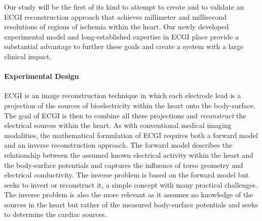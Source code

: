 Our study will be the first of its kind to attempt to create and to
validate an ECGI reconstruction approach that achieves millimeter and
millisecond resolutions of regions of ischemia within the heart. Our newly
developed experimental model and long-established expertise in ECGI place
provide a substantial advantage to further these goals and create a system
with a large clinical impact.


\paragraph{Experimental Design} ECGI is an image reconstruction technique in
which each electrode lead is a projection of the sources of bioelectricity
within the heart onto the body-surface.\cite{RSM:Mes86,RSM:Pul2010} The
goal of ECGI is then to combine all these projections and
\emph{reconstruct} the electrical sources within the heart. As with
conventional medical imaging modalities, the mathematical formulation of
ECGI requires both a forward model and an inverse reconstruction
approach. The forward model describes the relationship between the assumed
known electrical activity within the heart and the body-surface potentials
and captures the influence of torso geometry and electrical
conductivity.\cite{RSM:Mac2010b} The inverse problem is based on the
forward model but seeks to invert or reconstruct it, a simple concept with
many practical challenges.  The inverse problem is also the more relevant
as it assumes no knowledge of the sources in the heart but rather of the
measured body-surface potentials and seeks to determine the cardiac
sources.\cite{RSM:Mes86,RSM:Pul2010}



